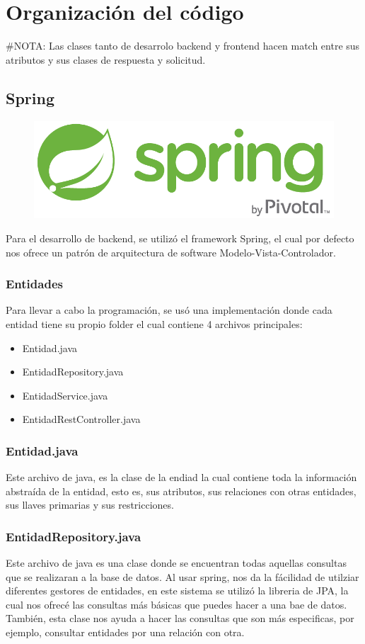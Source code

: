 \chapter{Organización del código}

\#NOTA: Las clases tanto de desarrolo backend y frontend hacen match entre sus atributos y sus clases de respuesta y solicitud.
\section{Spring}

\begin{figure}[!h]
    \centering
    \includegraphics[width=0.4\linewidth]{images/tecnologias/spring.png}
\end{figure}

Para el desarrollo de backend, se utilizó el framework Spring, el cual por defecto nos ofrece un patrón de arquitectura de software Modelo-Vista-Controlador.

\subsection{Entidades}
Para llevar a cabo la programación, se usó una implementación donde cada entidad tiene su propio folder el cual contiene 4 archivos principales:

\begin{itemize}
    \item Entidad.java
    \item EntidadRepository.java
    \item EntidadService.java
    \item EntidadRestController.java
\end{itemize} 

\subsection{Entidad.java}
Este archivo de java, es la clase de la endiad la cual contiene toda la información abstraída de la entidad, esto es, sus atributos, sus relaciones con otras entidades, sus llaves primarias y sus restricciones.
\subsection{EntidadRepository.java}
Este archivo de java es una clase donde se encuentran todas aquellas consultas que se realizaran a la base de datos. 
Al usar spring, nos da la fácilidad de utilziar diferentes gestores de entidades, en este sistema se utilizó la libreria de JPA, la cual nos ofrecé las consultas más básicas que puedes hacer a una bae de datos.
También, esta clase nos ayuda a hacer las consultas que son más especificas, por ejemplo, consultar entidades por una relación con otra.
